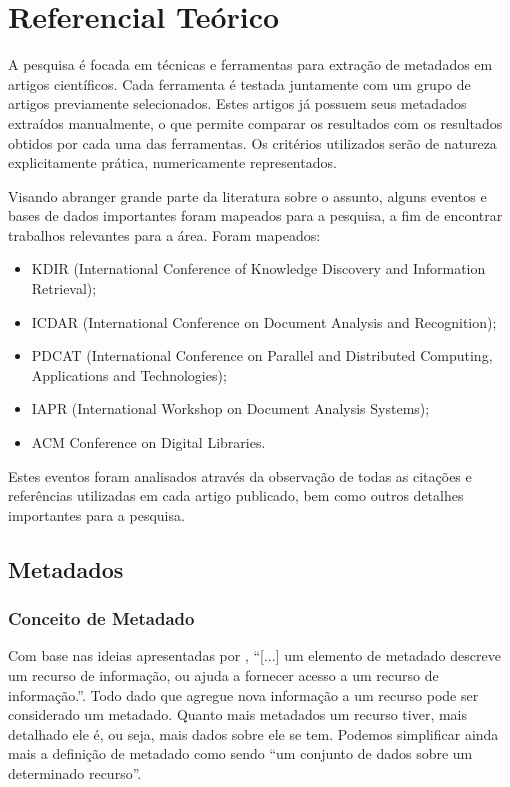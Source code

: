
\chapter{Referencial Teórico}
\label{cha:literature}

A pesquisa é focada em técnicas e ferramentas para extração de metadados em artigos científicos. Cada ferramenta é testada juntamente com um grupo de artigos previamente selecionados. Estes artigos já possuem seus metadados extraídos manualmente, o que permite comparar os resultados com os resultados obtidos por cada uma das ferramentas. Os critérios utilizados serão de natureza explicitamente prática, numericamente representados.

Visando abranger grande parte da literatura sobre o assunto, alguns eventos e bases de dados importantes foram mapeados para a pesquisa, a fim de encontrar trabalhos relevantes para a área. Foram mapeados:

\begin{itemize}
    \item KDIR (International Conference of Knowledge Discovery and Information Retrieval);
    \item ICDAR (International Conference on Document Analysis and Recognition);
    \item PDCAT (International Conference on Parallel and Distributed Computing, Applications and Technologies);
    \item IAPR (International Workshop on Document Analysis Systems);
    \item ACM Conference on Digital Libraries.
\end{itemize}

Estes eventos foram analisados através da observação de todas as citações e referências utilizadas em cada artigo publicado, bem como outros detalhes importantes para a pesquisa.

\section{Metadados}
\label{sec:metadados}

\subsection{Conceito de Metadado}
\label{ssec:metadata-concept}

Com base nas ideias apresentadas por \cite{meta-dados}, ``[...] um elemento de metadado descreve um recurso de informação, ou ajuda a fornecer acesso a um recurso de informação.''. Todo dado que agregue nova informação a um recurso pode ser considerado um metadado. Quanto mais metadados um recurso tiver, mais detalhado ele é, ou seja, mais dados sobre ele se tem. Podemos simplificar ainda mais a definição de metadado como sendo ``um conjunto de dados sobre um determinado recurso''.

